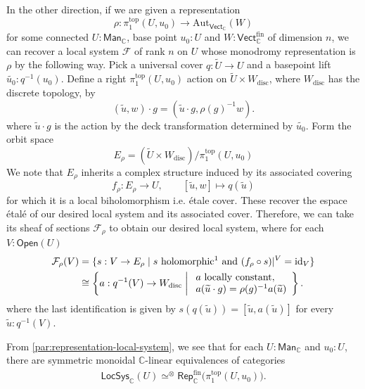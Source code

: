 \documentclass[11pt,letterpaper]{article}
\theoremstyle{numberfirstplain}
\numberwithin{equation}{theorem}
\theoremstyle{numberfirstupright}
\begin{document}
In the other direction, if we are given a representation 
$$\rho:\pi_1^{\mathrm{top}}(U,u_0)\rightarrow \mathrm{Aut}_{\mathsf{Vect}_{\mathbb C}}(W)$$
for some connected $U:\mathsf{Man}_{\mathbb C}$, base point $u_0:U$ and $W:\mathsf{Vect}_{\mathbb C}^{\mathrm{fin}}$ of dimension $n$, we can recover a local system $\mathcal F$ of rank $n$ on $U$ whose monodromy representation is $\rho$ by the following way. 
Pick a universal cover $q:\widetilde{U}\rightarrow U$ and a basepoint lift $\widetilde{u_0}: q^{-1}(u_0)$. 
Define a right $\pi_1^{\mathrm{top}}(U,u_0)$ action on $\widetilde{U}\times W_{\mathrm{disc}}$, where $W_{\mathrm{disc}}$ has the discrete topology, by 
$$(\widetilde{u}, w) \cdot g=(\widetilde{u} \cdot g, \rho(g)^{-1} w) .$$
where $\widetilde{u} \cdot g$ is the action by the deck transformation determined by $\widetilde{u_0}$. Form the orbit space
$$E_{\rho}=(\widetilde{U}\times W_{\mathrm{disc}})/\pi_1^{\mathrm{top}}(U,u_0)$$
We note that $E_{\rho}$ inherits a complex structure induced by its associated covering 
$$f_\rho:E_{\rho}\rightarrow U,\qquad [\widetilde{u},w]\mapsto q(\widetilde{u})$$
for which it is a local biholomorphism i.e. étale cover. These recover the espace étalé of our desired local system and its associated cover. 
Therefore, we can take its sheaf of sections $\mathcal F_\rho$ to obtain our desired local system, where for each $V:\mathsf{Open}(U)$
\[
\begin{aligned}
\mathcal F_\rho(V)
&=\{s:V\to E_\rho\mid s\text{ holomorphic\footnotemark \ and }(f_\rho\circ s)|^V=\mathrm{id}_V\}\\
&\cong\left\{a:q^{-1}(V)\to W_{\mathrm{disc}}\;\middle|\;
\begin{array}{l}
a\text{ locally constant},\\
a(\widetilde u\cdot g)=\rho(g)^{-1}a(\widetilde u)
\end{array}
\right\}.
\end{aligned}
\]
where the last identification is given by $s(q(\widetilde{u}))=[\widetilde{u},a(\widetilde{u})]$ for every $\widetilde{u}:q^{-1}(V)$. 

From \cref{par:representation-local-system}, we see that for each $U:\mathsf{Man}_{\mathbb C}$ and $u_0:U$, there are symmetric monoidal $\mathbb C$-linear equivalences of categories \cite[\S~7.2]{MacPherson1990}
\[
\begin{aligned}
\mathsf{LocSys}_{\mathbb C}(U)
\simeq^{\otimes}\mathsf{Rep}_{\mathbb C}^{\mathrm{fin}}\bigl(\pi_1^{\mathrm{top}}(U,u_0)\bigr).
\end{aligned}
\]
\end{document}
